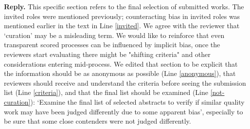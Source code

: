 \documentclass{article}
\newenvironment{Reply}{\noindent\color{BlueViolet}\textbf{Reply.}}{\vspace{1em}}
\begin{document}
\begin{Reply}
This specific section refers to the final selection of submitted works. The invited roles were mentioned previously; counteracting bias in invited roles was mentioned earlier in the text in Line \ref{invited}.
We agree with the reviewer that `curation' may be a misleading term.
We would like to reinforce that even transparent scored processes can be influenced by implicit bias, once the reviewers start evaluating there might be "shifting criteria" and other considerations entering mid-process.
We edited that section to be explicit that the information should be as anonymous as possible (Line \ref{anonymous}), that reviewers should receive and understand the criteria before seeing the submission list (Line \ref{criteria}), and that the final list should be examined (Line \ref{not-curation}): 
`Examine the final list of selected abstracts to verify if similar quality work may have been judged differently due to some apparent bias', especially to be sure that some close contenders were not judged differently.
   
   
\end{Reply}
\end{document}
